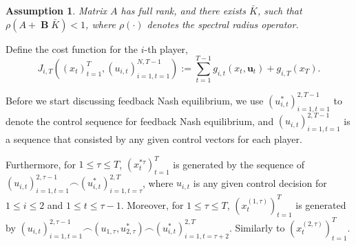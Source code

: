 \documentclass{article}
\DeclareMathOperator{\contB}{\mathbf{B}}
\newtheorem{assumption}{Assumption}
\begin{document}
\begin{assumption}\label{assumption:controllable}
    Matrix $A$ has full rank, and there exists $\bar{K}$, such that $\rho(A + \contB \bar{K}) < 1$, where $\rho(\cdot)$ denotes the spectral radius operator.
\end{assumption}
Define the cost function for the $i$-th player,
\begin{equation}\label{eq:LQcost}
    J_{i,T}((x_{t})_{t=1}^{T},(u_{i,t})_{i=1,t=1}^{N,T-1}) := \sum_{t=1}^{T-1} g_{i,t}(x_{t}, \mathbf{u}_{t}) + g_{i,T}(x_{T}).
\end{equation}

Before we start discussing feedback Nash equilibrium, we use $(u_{i,t}^{*})_{i=1,t=1}^{2,T-1}$ to denote the control sequence for feedback Nash equilibrium, and $(u_{i,t})_{i=1,t=1}^{2,T-1}$ is a sequence that consisted by any given control vectors for each player. 

Furthermore, for $1 \leq \tau \leq T$, $(x_{t}^{*\tau})_{t=1}^{T}$ is generated by the sequence of $(u_{i,t})_{i=1,t=1}^{2,\tau-1} \frown (u_{i,t}^{*})_{i=1,t=\tau}^{2,T}$, where $u_{i,t}$ is any given control decision for $1 \leq i \leq 2$ and $1 \leq t \leq \tau-1$. Moreover, for $1 \leq \tau \leq T$, $(x_{t}^{(1,\tau)})_{t=1}^{T}$ is generated by $(u_{i,t})_{i=1,t=1}^{2,\tau-1} \frown (u_{1,\tau},u_{2,\tau}^{*}) \frown (u_{i,t}^{*})_{i=1,t=\tau+2}^{2,T}$. Similarly to $(x_{t}^{(2,\tau)})_{t=1}^{T}$.
\end{document}
